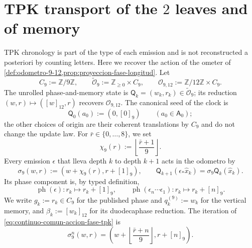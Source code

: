 \section{TPK transport of the \(2\) leaves and of memory}
\label{sec:continuo-comun-tpk-transporte}

TPK chronology is part of the type of each emission and is not
reconstructed a posteriori by counting letters. Here we recover the action of the
ometer of \cref{def:odometro-9-12,prop:proyeccion-fase-longitud}. Let
\begin{equation}
\label{eq:continuo-comun-ciclo-fase-tpk}
 C_9:=\mathbb Z/9\mathbb Z,\qquad
 \widetilde{\mathcal O}_{9}:=\mathbb Z_{\geq0}\times C_9,\qquad
 \mathcal O_{9,12}:=\mathbb Z/12\mathbb Z\times C_9.
\end{equation}
The unrolled phase-and-memory state is
\(\mathsf Q_k=(w_k,r_k)\in\widetilde{\mathcal O}_{9}\); its reduction
\((w,r)\mapsto([w]_{12},r)\) recovers
\(\mathcal O_{9,12}\). The canonical seed of the clock is
\begin{equation}
\label{eq:continuo-comun-semilla-fase-tpk}
 \mathsf Q_0(a_0):=(0,[0]_9)\qquad(a_0\in\mathsf A_0);
\end{equation}
the other choices of origin are their coherent translations by \(C_9\)
and do not change the update law. For
\(\bar r\in\{0,\ldots,8\}\), we set
\begin{equation}
\label{eq:continuo-comun-carry-fase-tpk}
 \chi_9(r):=\left\lfloor\frac{\bar r+1}{9}\right\rfloor.
\end{equation}
Every emission \(\epsilon\) that lleva depth \(k\) to depth \(k+1\)
acts in the odometro by
\begin{equation}
\label{eq:continuo-comun-accion-fase-tpk}
 \sigma_9(w,r):=(w+\chi_9(r),r+[1]_9),\qquad
 \mathsf Q_{k+1}(\epsilon_*\widehat x_k)
 =\sigma_9\mathsf Q_k(\widehat x_k).
\end{equation}
Its phase component is, by typed definition,
\begin{equation}
\label{eq:continuo-comun-fase-emision-tpk}
 \operatorname{ph}(\epsilon):r_k\longmapsto r_k+[1]_9,
 \qquad
 \operatorname{ph}(\epsilon_n\cdots\epsilon_1):
 r_k\longmapsto r_k+[n]_9.
\end{equation}
We write \(g_k:=r_k\in C_9\) for the published phase and
\(q^{(9)}_k:=w_k\) for the vertical memory, and
\(\beta_k:=[w_k]_{12}\) for its duodecaphase reduction. The iteration of
\eqref{eq:continuo-comun-accion-fase-tpk} is
\begin{equation}
\label{eq:continuo-comun-iteracion-fase-tpk}
 \sigma_9^n(w,r)=
 \left(w+\left\lfloor\frac{\bar r+n}{9}\right\rfloor,
       r+[n]_9\right).
\end{equation}
